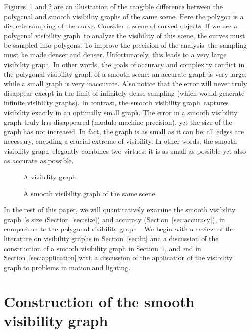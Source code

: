 \documentclass[11pt,twocolumn]{article}
\newcommand{\vgraph}{visibility graph\ }
\begin{document}
Figures~\ref{fig:poly} and \ref{fig:smooth} 
are an illustration of the tangible difference between
the polygonal and smooth visibility graphs of the same scene.
Here the polygon is a discrete sampling of the curve.
Consider a scene of curved objects.
If we use a polygonal \vgraph to analyze the visibility of this scene,
the curves must be sampled into polygons.
To improve the precision of the analysis,
the sampling must be made denser and denser.
Unfortunately, this leads to a very large visibility graph.
In other words, the goals of accuracy and complexity conflict in the
polygonal visibility graph of a smooth scene:
an accurate graph is very large,
while a small graph is very inaccurate.
Also notice that the error will never truly disappear except in the limit
of infinitely dense sampling (which would generate infinite visibility graphs).
In contrast, the smooth \vgraph captures visibility exactly in an optimally
small graph.
The error in a smooth \vgraph truly has disappeared (modulo machine precision),
yet the size of the graph has not increased.
In fact, the graph is as small as it can be: all edges are necessary,
encoding a crucial extreme of visibility.
In other words, the smooth \vgraph elegantly combines two virtues:
it is as small as possible yet also as accurate as possible.

% 

\begin{figure}
\caption{A visibility graph}
\label{fig:poly}
\end{figure}

% 

\begin{figure}
\caption{A smooth visibility graph of the same scene}
\label{fig:smooth}
\end{figure}

In the rest of this paper, we will quantitatively examine the smooth \vgraph's
size (Section~\ref{sec:size}) and accuracy (Section~\ref{sec:accuracy}), 
in comparison to the polygonal \vgraph.
We begin with a review of the literature on visibility graphs in Section~\ref{sec:lit}
and a discussion of the construction of a smooth visibility graph
in Section~\ref{sec:alg},
and end in Section~\ref{sec:application} with a discussion of the application
of the visibility graph to problems in motion and lighting.

\section{Construction of the smooth visibility graph}
\label{sec:alg}
\end{document}
